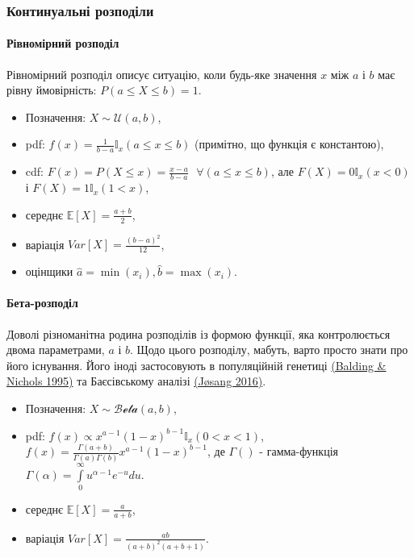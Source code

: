 \documentclass[
  11pt,
]{book}
\begin{document}
\subsubsection{Континуальні розподіли}\label{ux43aux43eux43dux442ux438ux43dux443ux430ux43bux44cux43dux456-ux440ux43eux437ux43fux43eux434ux456ux43bux438}

\paragraph{Рівномірний розподіл}\label{ux440ux456ux432ux43dux43eux43cux456ux440ux43dux438ux439-ux440ux43eux437ux43fux43eux434ux456ux43b}

Рівномірний розподіл описує ситуацію, коли будь-яке значення \(x\) між \(a\) і \(b\) має рівну ймовірність: \(P(a \leq X \leq b) = 1\).

\begin{itemize}
\item
  Позначення: \(X \sim \mathcal{U}(a, b)\),
\item
  pdf: \(f(x) = \frac{1}{b-a} \mathbb{I}_x (a \leq x \leq b)\) (примітно, що функція є константою),
\item
  cdf: \(F(x) = P(X \leq x) = \frac{x-a}{b-a} \text { } \forall (a \leq x \leq b)\), але \(F(X) = 0 \mathbb{I}_x(x < 0)\) і \(F(X) = 1 \mathbb{I}_x (1 < x)\),
\item
  середнє \(\mathbb{E} [X] = \frac{a+b}{2}\),
\item
  варіація \(Var[X] = \frac{(b-a)^2}{12}\),
\item
  оцінщики \(\hat{a} = \min(x_i), \hat{b} = \max(x_i)\).
\end{itemize}

\paragraph{Бета-розподіл}\label{ux431ux435ux442ux430-ux440ux43eux437ux43fux43eux434ux456ux43b}

Доволі різноманітна родина розподілів із формою функції, яка контролюється двома параметрами, \(a\) і \(b\). Щодо цього розподілу, мабуть, варто просто знати про його існування. Його іноді застосовують в популяційній генетиці \href{https://doi.org/10.1007\%2FBF01441146}{(Balding \& Nichols 1995)} та Баєсівському аналізі \href{https://doi.org/10.1109/MFI.2016.7849531}{(Jøsang 2016)}.

\begin{itemize}
\item
  Позначення: \(X \sim \mathcal{Beta}(a, b)\),
\item
  pdf: \(f(x) \propto x^{a - 1} (1-x)^{b-1} \mathbb{I}_x(0 < x < 1)\), \(f(x) = \frac{\Gamma (a + b)}{\Gamma (a) \Gamma (b)} x^{a - 1} (1 - x)^{b - 1}\), де \(\Gamma()\) - гамма-функція \(\Gamma(\alpha) = \int \limits_0^{\infty} u^{\alpha - 1} e^{-u} du\).
\item
  середнє \(\mathbb{E} [X] = \frac{a}{a + b}\),
\item
  варіація \(Var[X] = \frac{ab}{(a+b)^2 (a+b+1)}\).
\end{itemize}
\end{document}
